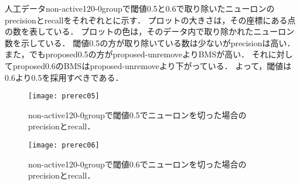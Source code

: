 人工データnon-active120-0groupで閾値0.5と0.6で取り除いたニューロンのprecisionとrecallをそれぞれとに示す．
プロットの大きさは，その座標にある点の数を表している．
プロットの色は，そのデータ内で取り除かれたニューロン数を示している．
閾値0.5の方が取り除いている数は少ないがprecisionは高い．
また，でもproposed0.5の方がproposed-unremoveよりBMSが高い．
それに対してproposed0.6のBMSはproposed-unremoveより下がっている．
よって，閾値は0.6より0.5を採用すべきである．
\begin{figure}[htbp]
    \begin{minipage}{0.5\hsize}
			\begin{center}
					\texttt{[image: prerec05]}
					\caption{non-active120-0groupで閾値0.5でニューロンを切った場合のprecisionとrecall．}
					\label{fig:prerec05}
			\end{center}
		\end{minipage}
    \begin{minipage}{0.5\hsize}
			\begin{center}
					\texttt{[image: prerec06]}
					\caption{non-active120-0groupで閾値0.6でニューロンを切った場合のprecisionとrecall．}
					\label{fig:prerec06}
			\end{center}
		\end{minipage}
\end{figure}

